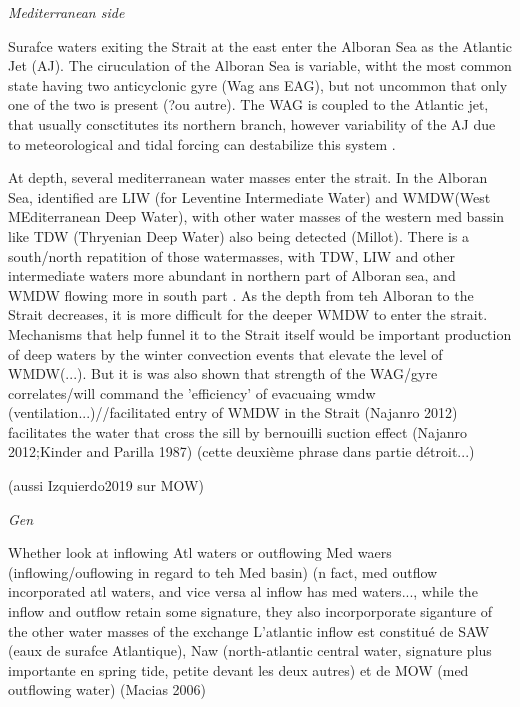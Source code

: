 \textit{Mediterranean side}


Surafce waters exiting the Strait at the east enter the Alboran Sea as the Atlantic Jet (AJ). The ciruculation of the Alboran Sea is variable, witht the most common state having two anticyclonic gyre (Wag ans EAG), but not uncommon that only one of the two is present \citep{millot_2005}(?ou autre). The WAG is coupled to the Atlantic jet, that usually consctitutes its northern branch, however variability of the AJ due to meteorological and tidal forcing can destabilize this system \citep{sanchez-garrido_2013,lorente_2019}.

At depth, several mediterranean water masses enter the strait. In the Alboran Sea, identified are LIW (for Leventine Intermediate Water) and WMDW(West MEditerranean Deep Water), with other water masses of the western med bassin like TDW (Thryenian Deep Water) also being detected (Millot). There is a south/north repatition of those watermasses, with TDW, LIW and other intermediate waters more abundant in northern part of Alboran sea, and WMDW flowing more in south part \citep{millot_2014}. As the depth from teh Alboran to the Strait decreases, it is more difficult for the deeper WMDW to enter the strait. Mechanisms that help funnel it to the Strait itself would be important production of deep waters by the winter convection events that elevate the level of WMDW(...). But it is was also shown that strength of the WAG/gyre correlates/will command the 'efficiency' of evacuaing wmdw (ventilation...)//facilitated entry of WMDW in the Strait (Najanro 2012) facilitates the water that cross the sill by bernouilli suction effect (Najanro 2012;Kinder and Parilla 1987) (cette deuxième phrase dans partie détroit...) 

(aussi Izquierdo2019 sur MOW)


\textit{Gen}

Whether look at inflowing Atl waters or outflowing Med waers (inflowing/ouflowing in regard to teh Med basin) (n fact, med outflow incorporated atl waters, and vice versa al inflow has med waters..., while the inflow and outflow retain some signature, they also incorporporate siganture of the other water masses of the exchange
L’atlantic inflow est constitué de SAW (eaux de surafce Atlantique), Naw (north-atlantic central water, signature plus importante en spring tide, petite devant les deux autres) et de MOW (med outflowing water) (Macias 2006)

